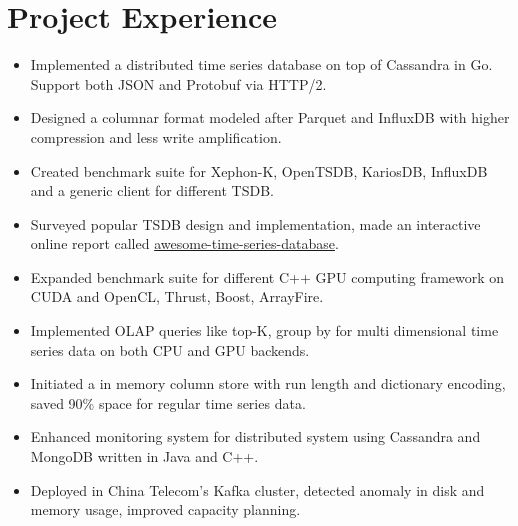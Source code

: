 \documentclass[11pt, letterpaper]{simple-cv}
\begin{document}
\section{Project Experience}



\begin{itemize}
  \item Implemented a distributed time series database on top of Cassandra in Go. Support both JSON and Protobuf via HTTP/2.
  \item Designed a columnar format modeled after Parquet and InfluxDB with higher compression and less write amplification.
  \item Created benchmark suite for Xephon-K, OpenTSDB, KariosDB, InfluxDB and a generic client for different TSDB.
  \item Surveyed popular TSDB design and implementation, made an interactive online report called \href{https://xephonhq.github.io/awesome-time-series-database}{awesome-time-series-database}.
\end{itemize}


\begin{itemize}
  \item Expanded benchmark suite for different C++ GPU computing framework on CUDA and OpenCL, Thrust, Boost, ArrayFire.
  \item Implemented OLAP queries like top-K, group by for multi dimensional time series data on both CPU and GPU backends.
  \item Initiated a in memory column store with run length and dictionary encoding, saved 90\% space for regular time series data.
\end{itemize}


\begin{itemize}
  \item Enhanced monitoring system for distributed system using Cassandra and MongoDB written in Java and C++.
  \item Deployed in China Telecom's Kafka cluster, detected anomaly in disk and memory usage, improved capacity planning.
\end{itemize}
\end{document}

